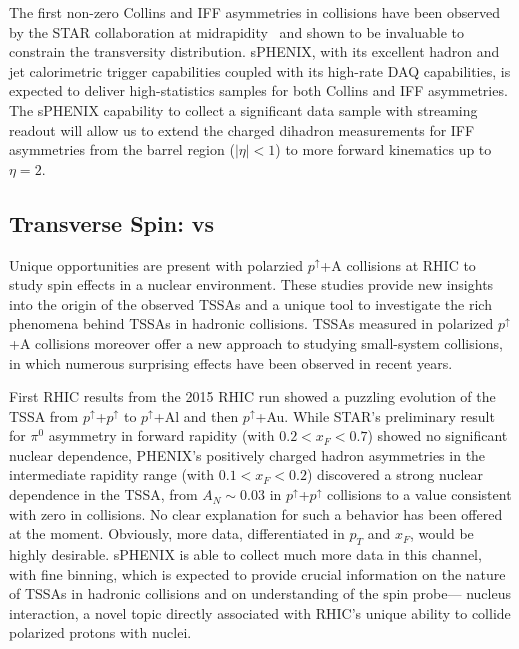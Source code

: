 The first non-zero Collins and IFF asymmetries in \pp collisions have
been observed by the STAR collaboration at midrapidity~\cite{Adamczyk:2017wld,Adamczyk:2017ynk} and shown to be
invaluable to constrain the transversity distribution. sPHENIX, with
its excellent hadron and jet calorimetric trigger capabilities coupled
with its high-rate DAQ capabilities, is expected to deliver
high-statistics samples for both Collins and IFF
asymmetries. The sPHENIX capability to collect a significant 
data sample with streaming readout will allow us to extend the charged
dihadron measurements for IFF asymmetries from the barrel region
($|\eta|<1$) to more forward kinematics up to $\eta=2$.  


\subsection {Transverse Spin: \pp vs \pA}

Unique opportunities are present with polarzied $p^{\uparrow}$+A collisions at RHIC to
study spin effects in a nuclear environment. These studies provide
new insights into the origin of the observed TSSAs and a unique tool
to investigate the rich phenomena behind TSSAs in hadronic
collisions. TSSAs measured in polarized $p^{\uparrow}$+A collisions moreover
offer a new approach to studying small-system collisions, in which
numerous surprising effects have been observed in recent years. 

First RHIC results from the 2015 RHIC run showed a puzzling evolution
of the TSSA from $p^{\uparrow}$+$p^{\uparrow}$ to $p^{\uparrow}$+Al and then $p^{\uparrow}$+Au. While STAR's
preliminary result for $\pi^{0}$ asymmetry in forward rapidity (with
$0.2<x_F<0.7$) showed no significant nuclear dependence, PHENIX's
positively charged hadron asymmetries in the intermediate rapidity
range (with $0.1<x_F<0.2$) discovered a strong nuclear dependence in
the TSSA, from $A_N \sim 0.03$ in $p^{\uparrow}$+$p^{\uparrow}$ collisions to a value
consistent with zero in \pAu collisions. No clear explanation for
such a behavior has been offered at the moment. Obviously, more data,
differentiated in $p_T$ and $x_F$, would be highly desirable. sPHENIX
is able to collect much more data in this channel, with fine binning,
which is expected to provide crucial information on the nature of
TSSAs in hadronic collisions and on understanding of the spin probe---
nucleus interaction, a novel topic directly associated with RHIC's
unique ability to collide polarized protons with nuclei. 

